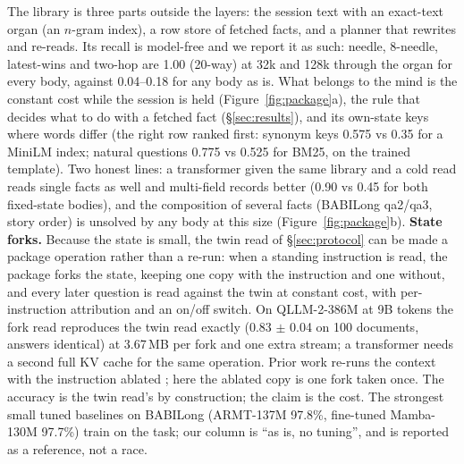\documentclass[11pt]{article}
\newcommand{\model}{QLLM-2}
\begin{document}
The library is three parts outside the layers: the session text with an exact-text organ (an $n$-gram index), a row store of fetched facts, and a planner that rewrites and re-reads. Its recall is model-free and we report it as such: needle, 8-needle, latest-wins and two-hop are 1.00 (20-way) at 32k and 128k through the organ for every body, against 0.04--0.18 for any body as is. What belongs to the mind is the constant cost while the session is held (Figure~\ref{fig:package}a), the rule that decides what to do with a fetched fact (\S\ref{sec:results}), and its own-state keys where words differ (the right row ranked first: synonym keys 0.575 vs 0.35 for a MiniLM index; natural questions 0.775 vs 0.525 for BM25, on the trained template). Two honest lines: a transformer given the same library and a cold read reads single facts as well and multi-field records better (0.90 vs 0.45 for both fixed-state bodies), and the composition of several facts (BABILong qa2/qa3, story order) is unsolved by any body at this size (Figure~\ref{fig:package}b). \textbf{State forks.} Because the state is small, the twin read of \S\ref{sec:protocol} can be made a package operation rather than a re-run: when a standing instruction is read, the package forks the state, keeping one copy with the instruction and one without, and every later question is read against the twin at constant cost, with per-instruction attribution and an on/off switch. On \model-386M at 9B tokens the fork read reproduces the twin read exactly (0.83 $\pm$ 0.04 on 100 documents, answers identical) at 3.67\,MB per fork and one extra stream; a transformer needs a second full KV cache for the same operation. Prior work re-runs the context with the instruction ablated \citep{shi2023cad,kim2024instructive}; here the ablated copy is one fork taken once. The accuracy is the twin read's by construction; the claim is the cost. The strongest small tuned baselines on BABILong (ARMT-137M 97.8\%, fine-tuned Mamba-130M 97.7\%) train on the task; our column is ``as is, no tuning'', and is reported as a reference, not a race.
\end{document}
